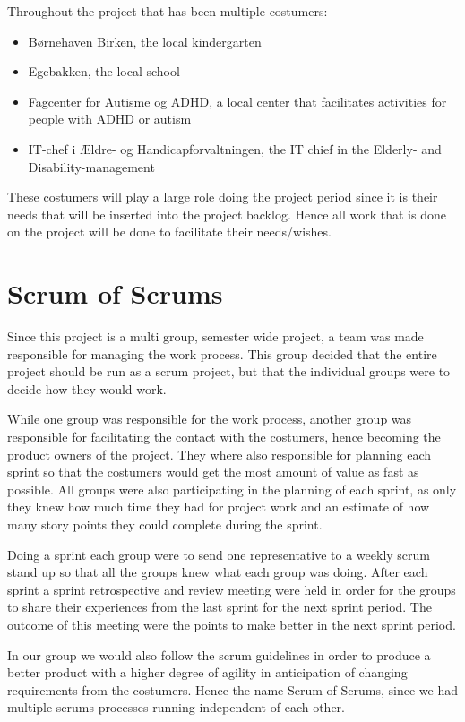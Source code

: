 Throughout the project that has been multiple costumers:

\begin{itemize}
	\item Børnehaven Birken, the local kindergarten
	\item Egebakken, the local school
	\item Fagcenter for Autisme og ADHD, a local center that facilitates activities for people with ADHD or autism
	\item IT-chef i Ældre- og Handicapforvaltningen, the IT chief in the Elderly- and Disability-management
\end{itemize}

These costumers will play a large role doing the project period since it is their needs that will be inserted into the project backlog. 
Hence all work that is done on the project will be done to facilitate their needs/wishes.

\section{Scrum of Scrums}
Since this project is a multi group, semester wide project, a team was made responsible for managing the work process. 
This group decided that the entire project should be run as a scrum project, but that the individual groups were to decide how they would work.

While one group was responsible for the work process, another group was responsible for facilitating the contact with the costumers, hence becoming the product owners of the project. 
They where also responsible for planning each sprint so that the costumers would get the most amount of value as fast as possible.
All groups were also participating in the planning of each sprint, as only they knew how much time they had for project work and an estimate of how many story points they could complete during the sprint.

Doing a sprint each group were to send one representative to a weekly scrum stand up so that all the groups knew what each group was doing. 
After each sprint a sprint retrospective and review meeting were held in order for the groups to share their experiences from the last sprint for the next sprint period.
The outcome of this meeting were the points to make better in the next sprint period.

In our group we would also follow the scrum guidelines in order to produce a better product with a higher degree of agility in anticipation of changing requirements from the costumers.
Hence the name Scrum of Scrums, since we had multiple scrums processes running independent of each other.

